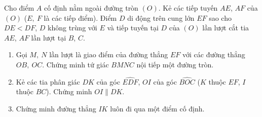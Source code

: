 \begin{ex}%
Cho điểm $A$ cố định nằm ngoài đường tròn $(O)$. Kẻ các tiếp tuyến $AE$, $AF$ của $(O)$ ($E,\ F$ là các tiếp điểm). Điểm $D$ di động trên cung lớn $EF$ sao cho $DE < DF$, $D$ không trùng với $E$ và tiếp tuyến tại $D$ của $(O)$ lần lượt cắt tia $AE$, $AF$ lần lượt tại $B$, $C$.
\begin{enumerate}
\item Gọi $M,\ N$ lần lượt là giao điểm của đường thẳng $EF$ với các đường thẳng $OB,\ OC$. Chứng minh tứ giác $BMNC$ nội tiếp một đường tròn.
\item Kẻ các tia phân giác $DK$ của góc $\widehat{EDF}$, $OI$ của góc $\widehat{BOC}$ ($K$ thuộc $EF$, $I$ thuộc $BC$). Chứng minh $OI \parallel DK$.
\item Chứng minh đường thẳng $IK$ luôn đi qua một điểm cố định.
\end{enumerate}
\loigiai
    {\begin{center}
\end{center}}
\end{ex}
